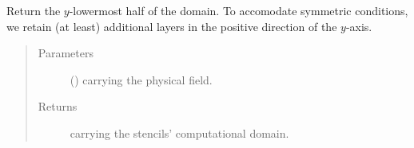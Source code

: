 \documentclass[letterpaper,10pt,english]{sphinxmanual}
\begin{document}
\begin{fulllineitems}

\begin{fulllineitems}
\label{\detokenize{api:dycore.horizontal_boundary.RelaxedSymmetricXZ.from_physical_to_computational_domain}}
Return the \(y\)-lowermost half of the domain. To accomodate symmetric conditions,
we retain (at least)  additional layers in the positive direction of the \(y\)-axis.
\begin{quote}\begin{description}
\item[{Parameters}] \leavevmode
{} () \textendash{}  carrying the physical field.

\item[{Returns}] \leavevmode
{} carrying the stencils’ computational domain.

\end{description}\end{quote}

\end{fulllineitems}


\end{fulllineitems}

\end{document}
